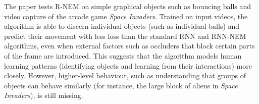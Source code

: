 \documentclass[letter,11pt]{article}
\begin{document}
The paper tests R-NEM on simple graphical objects such as bouncing balls and video capture of the arcade game \textit{Space Invaders}. Trained on input videos, the algorithm is able to discern individual objects (such as individual balls) and predict their movement with less loss than the standard RNN and RNN-NEM algorithms, even when external factors such as occluders that block certain parts of the frame are introduced. This suggests that the algorithm models human learning patterns (identifying objects and learning from their interactions) more closely. However, higher-level behaviour, such as understanding that groups of objects can behave similarly (for instance, the large block of aliens in \textit{Space Invaders}), is still missing.
\end{document}
